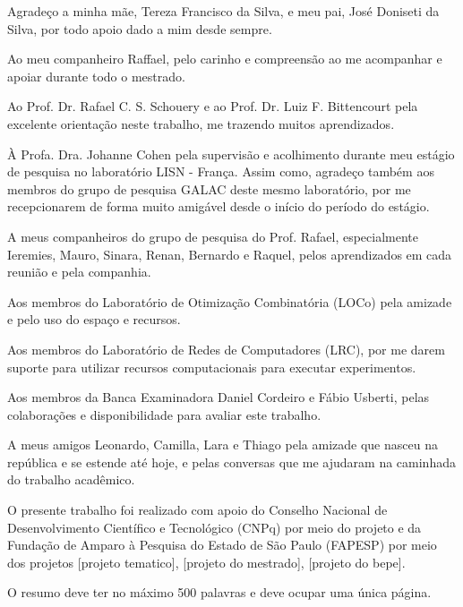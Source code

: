 \documentclass[English]{ic-tese-v3}
\begin{document}
Agradeço a minha mãe, Tereza Francisco da Silva, e meu pai, José Doniseti da Silva, por todo apoio dado a mim desde sempre.

Ao meu companheiro Raffael, pelo carinho e compreensão ao me acompanhar e apoiar durante todo o mestrado.

Ao Prof. Dr. Rafael C. S. Schouery e ao Prof. Dr. Luiz F. Bittencourt pela excelente orientação neste trabalho, me trazendo muitos aprendizados.

À Profa. Dra. Johanne Cohen pela supervisão e acolhimento durante meu estágio de pesquisa no laboratório LISN - França. Assim como, agradeço também aos membros do grupo de pesquisa GALAC deste mesmo laboratório, por me recepcionarem de forma muito amigável desde o início do período do estágio.

A meus companheiros do grupo de pesquisa do Prof. Rafael, especialmente Ieremies, Mauro, Sinara, Renan, Bernardo e Raquel, pelos aprendizados em cada reunião e pela companhia.

Aos membros do Laboratório de Otimização Combinatória (LOCo) pela amizade e pelo uso do espaço e recursos.

Aos membros do Laboratório de Redes de Computadores (LRC), por me darem suporte para utilizar recursos computacionais para executar experimentos.

Aos membros da Banca Examinadora Daniel Cordeiro e Fábio Usberti, pelas colaborações e disponibilidade para avaliar este trabalho.

A meus amigos Leonardo, Camilla, Lara e Thiago pela amizade que nasceu na república e se estende até hoje, e pelas conversas que me ajudaram na caminhada do trabalho acadêmico.

O presente trabalho foi realizado com apoio do Conselho Nacional de Desenvolvimento Científico e Tecnológico (CNPq) por meio do projeto  e da Fundação de Amparo à Pesquisa do Estado de São Paulo (FAPESP) por meio dos projetos [projeto tematico],  [projeto do mestrado], [projeto do bepe].


\begin{resumo}
O resumo deve ter no máximo 500 palavras e deve ocupar uma única página.
\end{resumo}
\end{document}
